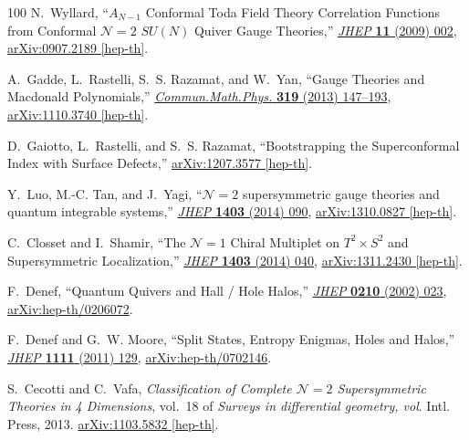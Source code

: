 \begin{thebibliography}{100}
N.~Wyllard, ``{$A_{N-1}$ Conformal Toda Field Theory Correlation Functions from Conformal ${\mathcal{N}}\!=2$ $SU(N)$ Quiver Gauge Theories},''
\href{http://dx.doi.org/10.1088/1126-6708/2009/11/002}{{\em JHEP} {\bfseries 11} (2009) 002},
\href{http://arxiv.org/abs/0907.2189}{{\ttfamily arXiv:0907.2189 [hep-th]}}.

A.~Gadde, L.~Rastelli, S.~S. Razamat, and W.~Yan, ``{Gauge Theories and Macdonald Polynomials},''
\href{http://dx.doi.org/10.1007/s00220-012-1607-8}{{\em Commun.Math.Phys.} {\bfseries 319} (2013) 147--193},
\href{http://arxiv.org/abs/1110.3740}{{\ttfamily arXiv:1110.3740 [hep-th]}}.

D.~Gaiotto, L.~Rastelli, and S.~S. Razamat, ``{Bootstrapping the Superconformal Index with Surface Defects},''
\href{http://arxiv.org/abs/1207.3577}{{\ttfamily arXiv:1207.3577 [hep-th]}}.

Y.~Luo, M.-C. Tan, and J.~Yagi, ``{$\mathcal{N} {=} 2$ supersymmetric gauge theories and quantum integrable systems},''
\href{http://dx.doi.org/10.1007/JHEP03(2014)090}{{\em JHEP} {\bfseries 1403} (2014) 090},
\href{http://arxiv.org/abs/1310.0827}{{\ttfamily arXiv:1310.0827 [hep-th]}}.

C.~Closset and I.~Shamir, ``{The $\mathcal{N}=1$ Chiral Multiplet on $T^2\times S^2$ and Supersymmetric Localization},''
\href{http://dx.doi.org/10.1007/JHEP03(2014)040}{{\em JHEP} {\bfseries 1403} (2014) 040},
\href{http://arxiv.org/abs/1311.2430}{{\ttfamily arXiv:1311.2430 [hep-th]}}.

F.~Denef, ``{Quantum Quivers and Hall / Hole Halos},''
\href{http://dx.doi.org/10.1088/1126-6708/2002/10/023}{{\em JHEP} {\bfseries 0210} (2002) 023},
\href{http://arxiv.org/abs/hep-th/0206072}{{\ttfamily arXiv:hep-th/0206072}}.

F.~Denef and G.~W. Moore, ``{Split States, Entropy Enigmas, Holes and Halos},''
\href{http://dx.doi.org/10.1007/JHEP11(2011)129}{{\em JHEP} {\bfseries 1111} (2011) 129},
\href{http://arxiv.org/abs/hep-th/0702146}{{\ttfamily arXiv:hep-th/0702146}}.

S.~Cecotti and C.~Vafa, {\em {Classification of Complete ${\mathcal{N}}\!=2$ Supersymmetric Theories in 4 Dimensions}}, vol.~18 of {\em Surveys in differential geometry, vol}.
\newblock Intl. Press, 2013.
\newblock \href{http://arxiv.org/abs/1103.5832}{{\ttfamily arXiv:1103.5832 [hep-th]}}.
\newblock


\end{thebibliography}
